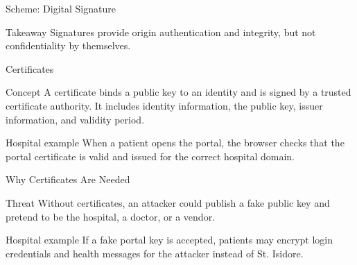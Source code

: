 \documentclass[presentation]{beamer}
\begin{document}
\begin{frame}[c]{Scheme: Digital Signature}
\begin{center}
\end{center}

\begin{block}{Takeaway}
Signatures provide origin authentication and integrity, but not confidentiality by themselves.
\end{block}
\end{frame}

\begin{frame}[c]{Certificates}
\begin{block}{Concept}
A certificate binds a public key to an identity and is signed by a trusted certificate authority.
It includes identity information, the public key, issuer information, and validity period.
\end{block}

\begin{exampleblock}{Hospital example}
When a patient opens the portal, the browser checks that the portal certificate is valid and issued
for the correct hospital domain.
\end{exampleblock}
\end{frame}

\begin{frame}[c]{Why Certificates Are Needed}
\begin{block}{Threat}
Without certificates, an attacker could publish a fake public key and pretend to be the hospital,
a doctor, or a vendor.
\end{block}

\begin{exampleblock}{Hospital example}
If a fake portal key is accepted, patients may encrypt login credentials and health messages for
the attacker instead of St. Isidore.
\end{exampleblock}
\end{frame}
\end{document}
